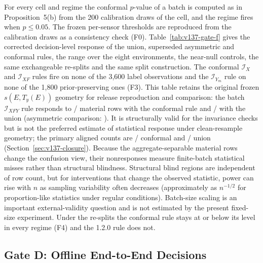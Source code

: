 \documentclass[10pt,journal,compsoc]{IEEEtran}
\newcommand{\IX}{\mathcal I_X}
\newcommand{\IXF}{\mathcal I_{XF}}
\newcommand{\IYm}{\mathcal I_{Y_m}}
\newcommand{\IXFY}{\mathcal I_{XFY}}
\begin{document}
For every cell and regime the conformal $p$-value of a batch is computed as
in Proposition~5(b) from the 200 calibration draws of the cell, and the
regime fires when $p\le0.05$. The frozen per-sensor thresholds are reproduced
from the calibration draws as a consistency check (F0).
Table~\ref{tab:v137-gate-f} gives the corrected decision-level response of
the union, superseded asymmetric and conformal rules, the range over the eight
environments, the near-null controls, the same exchangeable re-splits and the
same split construction. The conformal $\IX$ and $\IXF$
rules fire on none of the 3,600 label observations and the $\IYm$ rule on
none of the 1,800 prior-preserving ones (F3). This table retains the original
frozen $s(E,T_y(E))$ geometry for release reproduction and comparison: the
batch $\IXFY$ rule responds to \BatchFamilyLabelFires{}/\NMaterialLabel{}
material rows with the conformal rule and \BatchUnionLabelFires{}/\NMaterialLabel{}
with the union (asymmetric comparison: \BatchLegacyLabelFires{}). It is
structurally valid for the invariance checks but is not the preferred estimate
of statistical response under clean-resample geometry; the primary aligned
counts are \AlignedLabelFamilyFires{}/\AlignedLabelMaterialDen{} conformal and
\AlignedLabelUnionFires{}/\AlignedLabelMaterialDen{} union
(Section~\ref{sec:v137-closure}). Because the aggregate-separable material
rows change the confusion view, their nonresponses measure finite-batch
statistical misses rather than structural blindness. Structural blind regions are
independent of row count, but for interventions that change the observed
statistic, power can rise with $n$ as sampling variability often decreases
(approximately as $n^{-1/2}$ for proportion-like statistics under regular
conditions). Batch-size scaling is an important external-validity question and
is not estimated by the present fixed-size experiment. Under the re-splits the conformal rule stays at or
below its level in every regime (F4) and the 1.2.0 rule does not.



\subsection{Gate D: Offline End-to-End Decisions}
\end{document}
